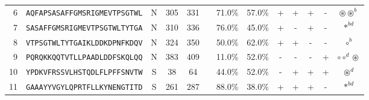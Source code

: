 \begin{tabular}{rcccccccccccc}
6  &  \texttt{AQFAPSASAFFGMSRIGMEVTPSGTWL} &       N &    305 &   331 &                                                                  &                          71.0\% &                           57.0\% &          + &           + &          + &           - &                                                                                                                  $ \circledast \circledast^b $ \\
7  &  \texttt{SASAFFGMSRIGMEVTPSGTWLTYTGA} &       N &    310 &   336 &                                                                  &                          76.0\% &                           45.0\% &          + &           - &          + &           - &                                                                                                                                  $ \ast^{bd} $ \\
8  &  \texttt{VTPSGTWLTYTGAIKLDDKDPNFKDQV} &       N &    324 &   350 &                                                                  &                          50.0\% &                           62.0\% &          + &           + &          - &           - &                                                                                                                                    $ \circ^b $ \\
9  &  \texttt{PQRQKKQQTVTLLPAADLDDFSKQLQQ} &       N &    383 &   409 &                                                                  &                          11.0\% &                           52.0\% &          - &           - &          - &           + &                                                                                                                  $ \circ \circ^d \circledast $ \\
10 &  \texttt{YPDKVFRSSVLHSTQDLFLPFFSNVTW} &       S &     38 &    64 &                                                                  &                          44.0\% &                           52.0\% &          - &           + &          + &           + &                                                                                                                              $ \circledast^d $ \\
11 &  \texttt{GAAAYYVGYLQPRTFLLKYNENGTITD} &       S &    261 &   287 &                                                                  &                          88.0\% &                           38.0\% &          + &           + &          + &           - &                                                                                                                                  $ \ast^{bd} $ \\

\end{tabular}
